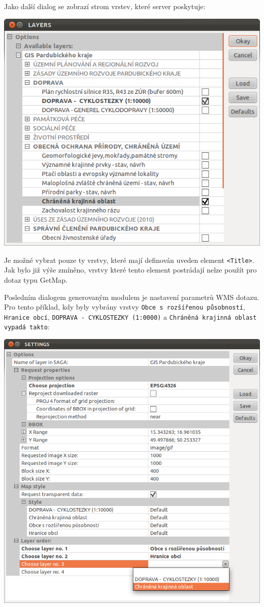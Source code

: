 \documentclass[a4paper,12pt]{article}
\begin{document}
Jako další dialog se zobrazí strom vrstev, které server poskytuje:

 \includegraphics[scale=0.6]{figures/SAGA_okno2.png}
 
Je možné vybrat pouze ty vrstvy, které mají definován uveden element
{\tt <Title>}. Jak bylo již výše zmíněno, vrstvy které tento element
postrádají nelze použít pro dotaz typu GetMap.
 

 Posledním dialogem generovaným modulem je nastavení parametrů WMS
 dotazu.  Pro tento příklad, kdy byly vybrány vrstvy {\tt Obce s~rozšířenou
 působností}, {\tt Hranice obcí}, {\tt DOPRAVA - CYKLOSTEZKY (1:0000)} a {\tt Chráněná
 krajinná oblast vypadá takto}:
 
  \includegraphics[scale=0.6]{figures/SAGA_okno3.png}
\end{document}
